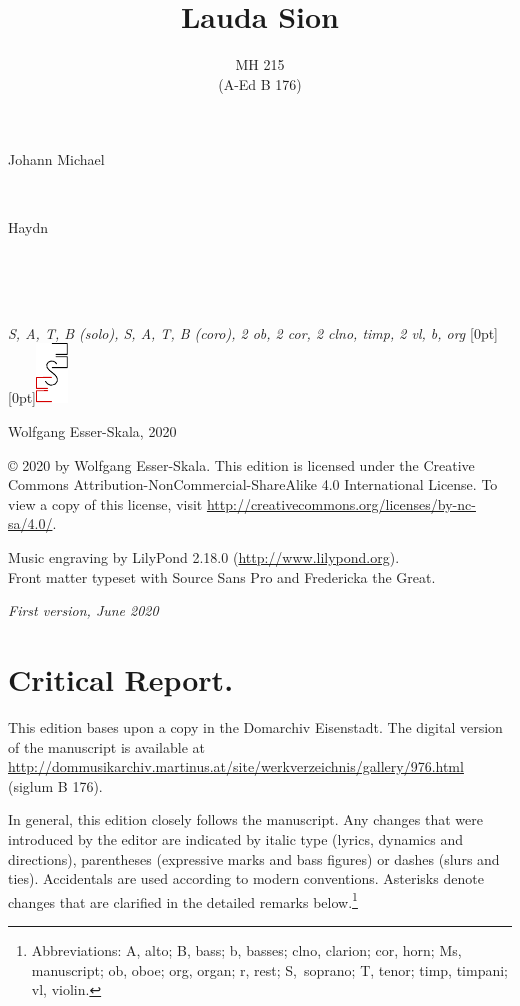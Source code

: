 \documentclass[parskip=full]{scrreprt}
\makeatletter
\DeclareRobustCommand{\sbseries}{\fontseries{sb}\selectfont}
\newcommand\fancytitlehead{
	\headingfont%
	\fontsize{80}{80}\selectfont\textcolor{black!80}{\@ifundefined{@shortname}{\@lastname}{\@shortname}.}\\[15pt]%
	\fontsize{60}{60}\selectfont\@ifundefined{@shorttitle}{\@title}{\@shorttitle}.%
}
\def\firstname#1{\def\@firstname{#1}}
\def\lastname#1{\def\@lastname{#1}}
\def\shortname#1{\def\@shortname{#1}}
\def\instrumentation#1{\def\@instrumentation{#1}}
\def\maketitle{%
\begin{titlepage}%
	\Large%
	{\@titlehead}%
	\vfill%
	{\strut\@firstname}\\%
	{\sbseries\color{oldred}\strut\@lastname}\\%
	{\strut\@namesuffix}%
	\vfill%
	{\sbseries\@title}\\%
	{\@subtitle}\\[\baselineskip]%
	{\itshape\@instrumentation}%
	\vfill%
	{\itshape\@parts}\hspace*{\fill}\raisebox{0pt}[0pt][0pt]{\includegraphics{ees_logo}}%
\end{titlepage}%
}
\newif\ifprintreport\printreportfalse
\makeatother
\begin{document}
\frenchspacing

\titlehead{\fancytitlehead}
\firstname{Johann Michael}
\lastname{Haydn}
\shortname{M. Haydn}
\title{Lauda Sion}
\subtitle{MH 215\\(A-Ed B 176)}
\instrumentation{S, A, T, B (solo), S, A, T, B (coro), 2 ob, 2 cor, 2 clno, timp, 2 vl, b, org}
\maketitle


\thispagestyle{empty}

\vspace*{\fill}

\hspace*{1em}Wolfgang Esser-Skala, 2020

© 2020 by Wolfgang Esser-Skala. This edition is licensed under the Creative Commons Attribution-NonCommercial-ShareAlike 4.0 International License. To view a copy of this license, visit \url{http://creativecommons.org/licenses/by-nc-sa/4.0/}. 

Music engraving by LilyPond 2.18.0 (\url{http://www.lilypond.org}).\\
Front matter typeset with Source Sans Pro and Fredericka the Great.

\textit{First version, June 2020}

\vspace*{2cm}

\ifprintreport
\chapter*{Critical Report.}

This edition bases upon a copy in the Domarchiv Eisenstadt. The digital version of the manuscript is available at \url{http://dommusikarchiv.martinus.at/site/werkverzeichnis/gallery/976.html} (siglum B 176).

In general, this edition closely follows the manuscript. Any changes that were introduced by the editor are indicated by italic type (lyrics, dynamics and directions), parentheses (expressive marks and bass figures) or dashes (slurs and ties). Accidentals are used according to modern conventions. Asterisks denote changes that are clarified in the detailed remarks below.\footnote{Abbreviations: A, alto; B, bass; b, basses; clno, clarion; cor, horn; Ms, manuscript; ob, oboe; org, organ; r, rest; S,~soprano; T, tenor; timp, timpani; vl, violin.}
\end{document}
